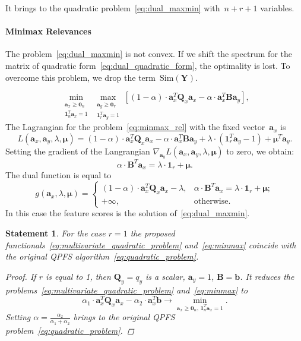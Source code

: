 \documentclass[12pt,twoside]{article}
\newtheorem{statement}{Statement}
\newcommand{\ba}{\mathbf{a}}
\newcommand{\bb}{\mathbf{b}}
\newcommand{\bY}{\mathbf{Y}}
\newcommand{\bB}{\mathbf{B}}
\newcommand{\bQ}{\mathbf{Q}}
\newcommand{\bmu}{\boldsymbol{\mu}}
\newcommand{\bOne}{\boldsymbol{1}}
\newcommand{\bZero}{\boldsymbol{0}}
\begin{document}
It brings to the quadratic problem~\eqref{eq:dual_maxmin} with~$n + r + 1$ variables.

\paragraph{Minimax Relevances}

The problem~\eqref{eq:dual_maxmin} is not convex. If we shift the spectrum for the matrix of quadratic form~\eqref{eq:dual_quadratic_form}, the optimality is lost. To overcome this problem, we drop the term~$\text{Sim}(\bY)$.

\begin{equation}
\min_{\substack{\ba_x \geq \bZero_n \\ \bOne_n^T\ba_x=1}} 	\max_{\substack{\ba_y \geq \bZero_r \\ \bOne_r^T\ba_y=1}} \left[ (1 - \alpha) \cdot \ba_x^T \bQ_x \ba_x - \alpha \cdot \ba_x^T \bB \ba_y \right],
\label{eq:minmax_rel}
\end{equation}
The Lagrangian for the problem~\eqref{eq:minmax_rel} with the fixed vector~$\ba_x$ is
\[
L(\ba_x, \ba_y, \lambda, \bmu) = (1 - \alpha) \cdot \ba_x^T \bQ_x \ba_x - \alpha \cdot \ba_x^T \bB \ba_y + \lambda \cdot  (\bOne_r^T \ba_y - 1) + \bmu^T \ba_y.
\]
Setting the gradient of the Langrangian $\nabla_{\ba_y} L(\ba_x, \ba_y, \lambda, \bmu)$ to zero, we obtain:
\begin{equation*}
\alpha \cdot \bB^T \ba_x = \lambda \cdot \bOne_r + \bmu.
\end{equation*}
The dual function is equal to
\begin{equation}
g(\ba_x, \lambda, \bmu) =
\begin{cases}
(1 - \alpha) \cdot \ba_x^T \bQ_x \ba_x - \lambda, & \alpha \cdot \bB^T \ba_x = \lambda \cdot \bOne_r + \bmu;  \\
+ \infty, & \text{otherwise}.
\end{cases}
\end{equation}
In this case the feature scores is the solution of~\eqref{eq:dual_maxmin}.

\begin{statement}
	For the case $r=1$ the proposed functionals~\eqref{eq:multivariate_quadratic_problem} and~\eqref{eq:minmax} coincide with the original QPFS algorithm~\eqref{eq:quadratic_problem}.

	\begin{proof}
		If $r$ is equal to 1, then $\bQ_y = q_y$ is a scalar, $\ba_y = 1$, $\bB = \bb$. It reduces the problems~\eqref{eq:multivariate_quadratic_problem} and~\eqref{eq:minmax} to
		\[
		\alpha_1 \cdot \ba_x^T \bQ_x \ba_x - \alpha_2 \cdot \ba_x^T \bb \rightarrow \min_{\ba_x \geq \bZero_n, \, \bOne_n^T\ba_x=1} .
		\]
		Setting $\alpha = \frac{\alpha_2}{\alpha_1 + \alpha_2}$ brings to the original QPFS problem~\eqref{eq:quadratic_problem}.
	\end{proof}
\end{statement}
\end{document}
